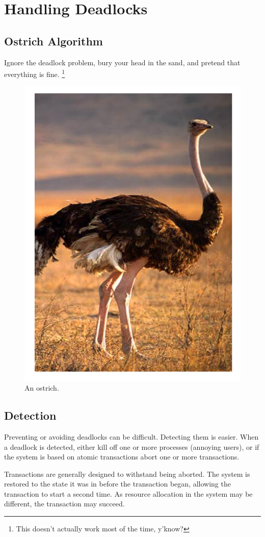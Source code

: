 \section{Handling Deadlocks}
\subsection{Ostrich Algorithm}
Ignore the deadlock problem, bury your head in the sand, and pretend that everything is fine. \footnote{This doesn't actually work most of the time, y'know?}

\begin{figure}[h]
\centering
\includegraphics[width=0.7\linewidth]{figures/screenshot041}
\caption{An ostrich.}
\label{fig:screenshot041}
\end{figure}

\pagebreak
\subsection{Detection}
Preventing or avoiding deadlocks can be difficult. Detecting them is easier. When a deadlock is detected, either kill off one or more processes (annoying users), or if the system is based on atomic transactions abort one or more transactions.

Transactions are generally designed to withstand being aborted. The system is restored to the state it was in before the transaction began, allowing the transaction to start a second time. As resource allocation in the system may be different, the transaction may succeed.
